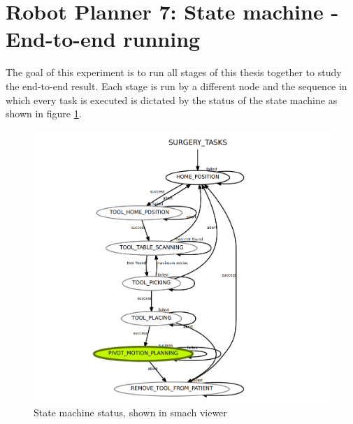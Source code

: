 \newpage
\section{Robot Planner 7: State machine - End-to-end running}

The goal of this experiment is to run all stages of this thesis together to study the end-to-end result. Each stage is run by a different node and the sequence in which every task is executed is dictated by the status 
of the state machine as shown in figure \ref{smack-state-machine}.

\begin{center}
\begin{figure}[!htb]
\centering
\includegraphics[width=\textwidth]{images/state-machine-all-tasks.png}
\caption{State machine status, shown in smach viewer}
\label{smack-state-machine}
\end{figure}
\end{center}